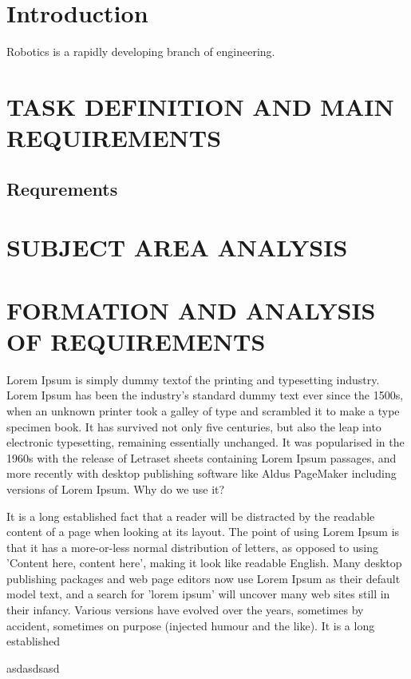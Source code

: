 
\section*{Introduction}
Robotics is a rapidly developing branch of engineering.

\section{TASK DEFINITION AND MAIN REQUIREMENTS}
    \subsection{Requrements}
\section{SUBJECT AREA ANALYSIS}

    \citep{progit}
\section{FORMATION AND ANALYSIS OF REQUIREMENTS}
Lorem Ipsum is simply dummy textof the printing and typesetting industry. Lorem Ipsum has been the industry's standard dummy text ever since the 1500s, when an unknown printer took a galley of type and scrambled it to make a type specimen book. It has survived not only five centuries, but also the leap into electronic typesetting, remaining essentially unchanged. It was popularised in the 1960s with the release of Letraset sheets containing Lorem Ipsum passages, and more recently with desktop publishing software like Aldus PageMaker including versions of Lorem Ipsum.
Why do we use it?

It is a long established fact that a reader will be distracted by the readable content of a page when looking at its layout. The point of using Lorem Ipsum is that it has a more-or-less normal distribution of letters, as opposed to using 'Content here, content here', making it look like readable English. Many desktop publishing packages and web page editors now use Lorem Ipsum as their default model text, and a search for 'lorem ipsum' will uncover many web sites still in their infancy. Various versions have evolved over the years, sometimes by accident, sometimes on purpose (injected humour and the like).
It is a long established \citep{ppmodel}

asdasdsasd

% 
